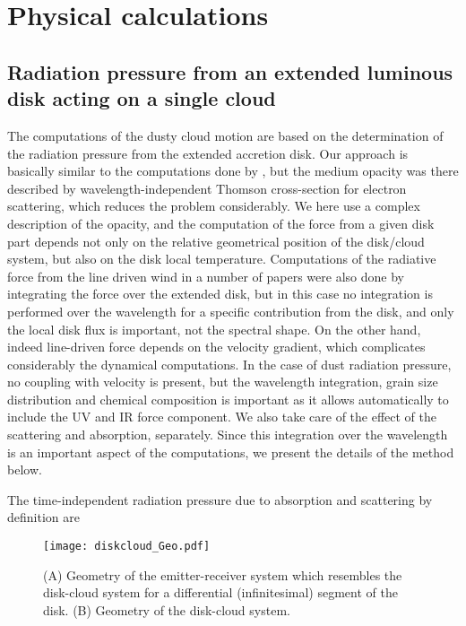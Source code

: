 \documentclass[twocolumn]{aastex62}
\begin{document}
\newpage

\appendix

\section{Physical calculations}\label{sect:appendix_A}

\subsection{Radiation pressure from an extended luminous disk acting on a single cloud}

The computations of the dusty cloud motion are based on the determination of the radiation pressure from the extended accretion disk. Our approach is basically similar to the computations done by \citet{icke1980}, but the medium opacity was there described by wavelength-independent Thomson cross-section for electron scattering, which reduces the problem considerably. We here use a complex description of the opacity, and the computation of the force from a given disk part depends not only on the relative geometrical position of the disk/cloud system, but also on the disk local temperature. Computations of the radiative force from the line driven wind in a number of papers \citep[e.g.][]{Pereyra1997,proga1998,feldmeier1999} were also done by integrating the force over the extended disk, but in this case no integration is performed over the wavelength for a specific contribution from the disk, and only the local disk flux is important, not the spectral shape. On the other hand, indeed line-driven force depends on the velocity gradient, which complicates considerably the dynamical computations. In the case of dust radiation pressure, no coupling with velocity is present, but the wavelength integration, grain size distribution and chemical composition is important as it allows automatically to include the UV and IR force component. We also take care of the effect of the scattering and absorption, separately. Since this integration over the wavelength is an important aspect of the computations, we present the details of the method below.

The time-independent radiation pressure due to absorption and scattering by definition \citep{mihalas1978book} are

\begin{figure}[b]
	\centering
	\texttt{[image: diskcloud\_Geo.pdf]}
	\caption{(A) Geometry of the emitter-receiver system which resembles the disk-cloud system for a differential (infinitesimal) segment of the disk. (B) Geometry of the disk-cloud system.}
	\label{fig:geometry_DiskCloud}
\end{figure}
\end{document}
